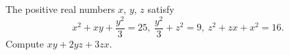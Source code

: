 The positive real numbers $x$, $y$, $z$ satisfy
\[
x^2 + xy + \frac{y^2}{3} = 25,\ \frac{y^2}{3} + z^2 = 9,\ z^2 + zx + x^2 = 16.
\]
Compute $xy + 2yz + 3zx$.
